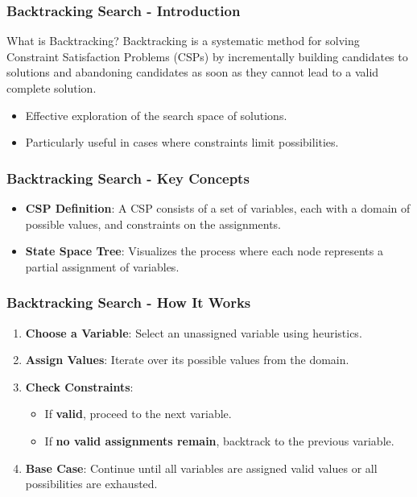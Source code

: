 \documentclass[aspectratio=169]{beamer}
\begin{document}
\begin{frame}[fragile]
    \frametitle{Backtracking Search - Introduction}
    \begin{block}{What is Backtracking?}
        Backtracking is a systematic method for solving Constraint Satisfaction Problems (CSPs) by incrementally building candidates to solutions and abandoning candidates as soon as they cannot lead to a valid complete solution.
    \end{block}
    
    \begin{itemize}
        \item Effective exploration of the search space of solutions.
        \item Particularly useful in cases where constraints limit possibilities.
    \end{itemize}
\end{frame}

\begin{frame}[fragile]
    \frametitle{Backtracking Search - Key Concepts}
    \begin{itemize}
        \item \textbf{CSP Definition}: A CSP consists of a set of variables, each with a domain of possible values, and constraints on the assignments.
        \item \textbf{State Space Tree}: Visualizes the process where each node represents a partial assignment of variables.
    \end{itemize}
\end{frame}

\begin{frame}[fragile]
    \frametitle{Backtracking Search - How It Works}
    \begin{enumerate}
        \item \textbf{Choose a Variable}: Select an unassigned variable using heuristics.
        \item \textbf{Assign Values}: Iterate over its possible values from the domain.
        \item \textbf{Check Constraints}:
            \begin{itemize}
                \item If \textbf{valid}, proceed to the next variable.
                \item If \textbf{no valid assignments remain}, backtrack to the previous variable.
            \end{itemize}
        \item \textbf{Base Case}: Continue until all variables are assigned valid values or all possibilities are exhausted.
    \end{enumerate}
\end{frame}
\end{document}
